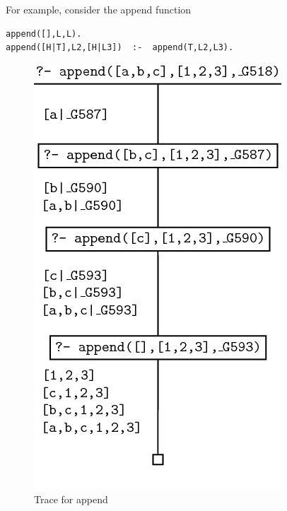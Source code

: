 \documentclass[thesis-solanki.tex]{subfiles}
\begin{document}
\newpage

For example, consider the append function

\begin{verbatim}
append([],L,L).
append([H|T],L2,[H|L3])  :-  append(T,L2,L3).
\end{verbatim}


\begin{figure}[h]
\centering
\includegraphics[scale = 0.5]{PrologAppendWorking.png}
\caption{Trace for append \cite{webiste:learnprolognowappend}}
\label{fig:Trace for append}
\end{figure}

\end{document}
